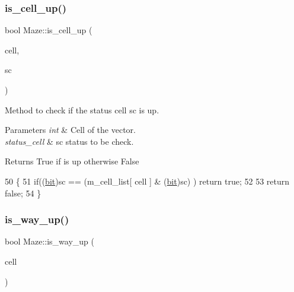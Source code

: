 \subsubsection{\texorpdfstring{is\+\_\+cell\+\_\+up()}{is\_cell\_up()}\hspace{0.1cm}{\footnotesize\ttfamily [2/2]}}
{\footnotesize\ttfamily bool Maze\+::is\+\_\+cell\+\_\+up (\begin{DoxyParamCaption}\item[{int}]{cell,  }\item[{\hyperlink{classMaze_a07167e321eac2b67100fb82ecb98f1d1}{status\+\_\+cell}}]{sc }\end{DoxyParamCaption})}



Method to check if the status cell sc is up. 


\begin{DoxyParams}{Parameters}
{\em int} & Cell of the vector. \\
\hline
{\em status\+\_\+cell} & sc status to be check. \\
\hline
\end{DoxyParams}
\begin{DoxyReturn}{Returns}
True if is up otherwise False 
\end{DoxyReturn}

\begin{DoxyCode}
50 \{
51     \textcolor{keywordflow}{if}((\hyperlink{maze_8h_a789d352559efaa396a258805d44f4289}{bit})sc == (m\_cell\_list[ cell ] & (\hyperlink{maze_8h_a789d352559efaa396a258805d44f4289}{bit})sc) ) \textcolor{keywordflow}{return} \textcolor{keyword}{true};
52 
53     \textcolor{keywordflow}{return} \textcolor{keyword}{false};
54 \}
\end{DoxyCode}
\mbox{\label{classMaze_a308fa695665de6217c0e7f28aab5adda}} 
\subsubsection{\texorpdfstring{is\+\_\+way\+\_\+up()}{is\_way\_up()}}
{\footnotesize\ttfamily bool Maze\+::is\+\_\+way\+\_\+up (\begin{DoxyParamCaption}\item[{int}]{cell }\end{DoxyParamCaption})}



